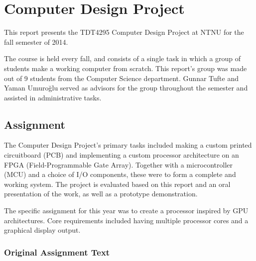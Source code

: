 \documentclass[../main/report.tex]{subfiles}
\begin{document}
\chapter{Computer Design Project}
\label{sec:intro}

This report presents the TDT4295 Computer Design Project at NTNU for the fall semester of 2014.

The course is held every fall, and consists of a single task in which a group of students make a working computer from scratch.
This report's group was made out of 9 students from the Computer Science department.
Gunnar Tufte and Yaman Umuroğlu served as advisors for the group throughout the semester and assisted in administrative tasks.

\section{Assignment}

The Computer Design Project's primary tasks included making a custom printed circuitboard (PCB) and implementing a custom processor architecture on an FPGA (Field-Programmable Gate Array).
Together with a microcontroller (MCU) and a choice of I/O components, these were to form a complete and working system.
The project is evaluated based on this report and an oral presentation of the work, as well as a prototype demonstration.

The specific assignment for this year was to create a processor inspired by GPU architectures.
Core requirements included having multiple processor cores and a graphical display output.

\newpage

\vspace*{1cm}
\subsection{Original Assignment Text}

\vspace{0.5cm}
\noindent
\end{document}

